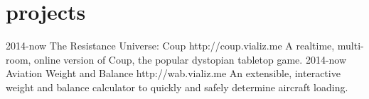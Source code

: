 \documentclass[]{cv-style}          %
\begin{document}
\section{projects}
\begin{entrylist}
\entry
{2014-now}
{The Resistance Universe: Coup}
{http://coup.vializ.me}
{A realtime, multi-room, online version of Coup, the popular dystopian tabletop game.}
\entry
{2014-now}
{Aviation Weight and Balance}
{http://wab.vializ.me}
{An extensible, interactive weight and balance calculator to quickly and safely determine aircraft loading.}


\end{entrylist}
\end{document}
